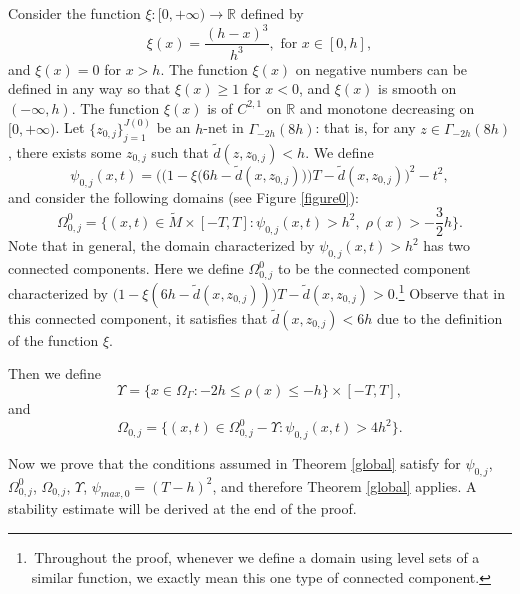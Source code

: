 \documentclass[11pt,letterpaper]{amsart}
\numberwithin{equation}{section}
\theoremstyle{definition}
\theoremstyle{plain}
\theoremstyle{definition}
\theoremstyle{plain}
\theoremstyle{definition}
\theoremstyle{plain}
\begin{document}
Consider the function $\xi:[0,+\infty)\to\mathbb{R}$ defined by
\begin{equation}\label{xidef}
\xi(x)=\frac{(h-x)^3}{h^3}, \textrm{ for } x\in [0,h],
\end{equation}
and $\xi(x)=0$ for $x>h$. The function $\xi(x)$ on negative numbers can be defined in any way so that $\xi(x)\geq 1$ for $x<0$, and $\xi(x)$ is smooth on $(-\infty,h)$. 
The function $\xi(x)$ is of $C^{2,1}$ on $\mathbb{R}$ and monotone decreasing on $[0,+\infty)$. Let $\{z_{0,j}\}_{j=1}^{J(0)}$ be an $h$-net in $\Gamma_{-2h}(8h)$: that is, for any $z\in \Gamma_{-2h}(8h)$, there exists some $z_{0,j}$ such that $\widetilde{d}(z,z_{0,j})<h$. We define
\begin{equation}\label{psi0}
\psi_{0,j}(x,t)=\bigg(\Big(1-\xi \big(6h-\widetilde{d}(x,z_{0,j})\big)\Big)T-\widetilde{d}(x,z_{0,j})\bigg)^2-t^2,
\end{equation}
and consider the following domains (see Figure \ref{figure0}):
\begin{equation}\label{Omega00}
\Omega^0_{0,j} =\big\{(x,t)\in \widetilde{M}\times[-T,T]: \psi_{0,j}(x,t) > h^2,\; \rho(x)>-\frac{3}{2}h \big\}.
\end{equation}
Note that in general, the domain characterized by $\psi_{0,j}(x,t) > h^2$ has two connected components. Here we define $\Omega^0_{0,j}$ to be the connected component characterized by $\big(1-\xi(6h-\widetilde{d}(x,z_{0,j}))\big)T-\widetilde{d}(x,z_{0,j})>0$.\footnote{\,Throughout the proof, whenever we define a domain using level sets of a similar function, we exactly mean this one type of connected component.}
Observe that in this connected component, it satisfies that $\widetilde{d}(x,z_{0,j})<6h$ due to the definition of the function $\xi$.

Then we define
\begin{equation}\label{Upsilon}
\Upsilon=\{x\in \Omega_{\Gamma}: -2h\leqslant \rho(x)\leqslant -h\}\times [-T,T],
\end{equation} 
and
\begin{equation}\label{Omega0j}
\Omega_{0,j} =\big\{(x,t)\in  \Omega^0_{0,j}-\Upsilon: \psi_{0,j}(x,t) > 4h^2 \big\}.
\end{equation} 

Now we prove that the conditions assumed in Theorem \ref{global} satisfy for $\psi_{0,j}$, $\Omega_{0,j}^0$, $\Omega_{0,j}$, $\Upsilon$, $\psi_{max,0}=(T-h)^2$, and therefore Theorem \ref{global} applies. A stability estimate will be derived at the end of the proof.
\end{document}
